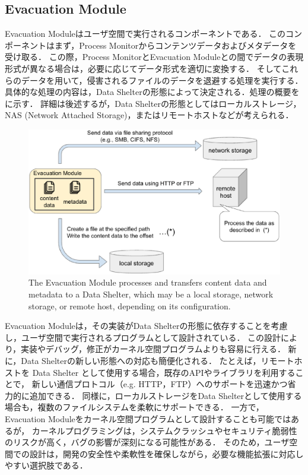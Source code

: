\subsection{Evacuation Module}
Evacuation Moduleはユーザ空間で実行されるコンポーネントである．
このコンポーネントはまず，Process Monitorからコンテンツデータおよびメタデータを受け取る．
この際，Process MonitorとEvacuation Moduleとの間でデータの表現形式が異なる場合は，必要に応じてデータ形式を適切に変換する．
そしてこれらのデータを用いて，侵害されるファイルのデータを退避する処理を実行する．
具体的な処理の内容は，Data Shelterの形態によって決定される．処理の概要をに示す．
詳細は後述するが，Data Shelterの形態としてはローカルストレージ，NAS (Network Attached Storage)，またはリモートホストなどが考えられる．
\begin{figure}[t]
  \centering
  \includegraphics[width=0.9\columnwidth]{doc/img/how-to-evacuate.eps}
  \caption{The Evacuation Module processes and transfers content data and metadata to a Data Shelter,
    which may be a local storage, network storage, or remote host, depending on its configuration.}
  \label{fig:how-to-evacuate}
\end{figure}


Evacuation Moduleは，その実装がData Shelterの形態に依存することを考慮し，ユーザ空間で実行されるプログラムとして設計されている．
この設計により，実装やデバッグ，修正がカーネル空間プログラムよりも容易に行える．
新に，Data Shelterの新しい形態への対応も簡便化される．
たとえば，リモートホストを Data Shelter として使用する場合，既存のAPIやライブラリを利用することで，
新しい通信プロトコル（e.g. HTTP，FTP）へのサポートを迅速かつ省力的に追加できる．
同様に，ローカルストレージをData Shelterとして使用する場合も，複数のファイルシステムを柔軟にサポートできる．
一方で，Evacuation Moduleをカーネル空間プログラムとして設計することも可能ではあるが，
カーネルプログラミングは，システムクラッシュやセキュリティ脆弱性のリスクが高く，バグの影響が深刻になる可能性がある．
そのため，ユーザ空間での設計は，開発の安全性や柔軟性を確保しながら，必要な機能拡張に対応しやすい選択肢である．

